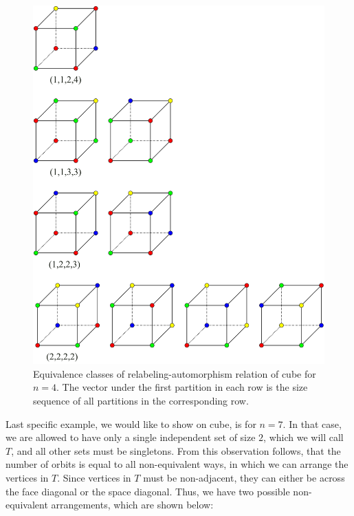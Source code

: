 \begin{figure}[H]
    \centering
    \includegraphics[width=1\textwidth]{Resources/Figs/cube_non_relaut-4-clrings.pdf}
    \caption{Equivalence classes of relabeling-automorphism relation of cube for $n=4$. The vector under the first partition in each row is the size sequence of all partitions in the corresponding row.}
    \label{fig:cube-4clring-relaut-classes}
\end{figure}

Last specific example, we would like to show on cube, is for $n=7$. In that case, we are allowed to have only a single independent set of size $2$, which we will call $T$, and all other sets must be singletons. From this observation follows, that the number of orbits is equal to all non-equivalent ways, in which we can arrange the vertices in $T$. Since vertices in $T$ must be non-adjacent, they can either be across the face diagonal or the space diagonal. Thus, we have two possible non-equivalent arrangements, which are shown below:

